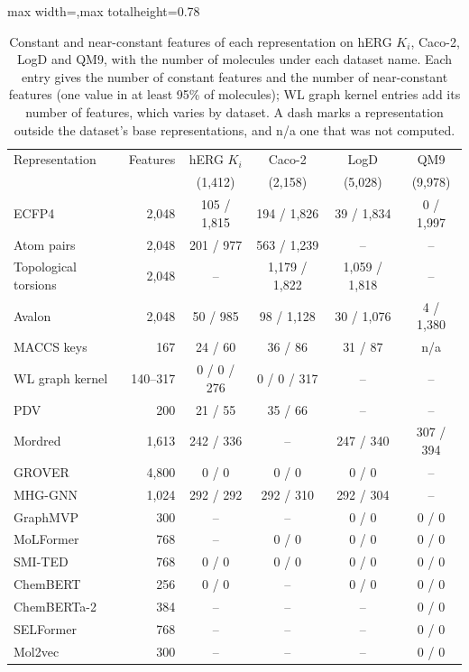 \begin{table}[htbp]
\centering
\small
\setlength{\tabcolsep}{4pt}
\begin{adjustbox}{max width=\textwidth,max totalheight=0.78\textheight}
\begin{tabular}{lrcccc}
\toprule
Representation & Features & hERG $K_i$ & Caco-2 & LogD & QM9 \\
 & & (1,412) & (2,158) & (5,028) & (9,978) \\
\midrule
ECFP4 & 2,048 & 105 / 1,815 & 194 / 1,826 & 39 / 1,834 & 0 / 1,997 \\
Atom pairs & 2,048 & 201 / 977 & 563 / 1,239 & -- & -- \\
Topological torsions & 2,048 & -- & 1,179 / 1,822 & 1,059 / 1,818 & -- \\
Avalon & 2,048 & 50 / 985 & 98 / 1,128 & 30 / 1,076 & 4 / 1,380 \\
MACCS keys & 167 & 24 / 60 & 36 / 86 & 31 / 87 & n/a \\
WL graph kernel & 140--317 & 0 / 0 / 276 & 0 / 0 / 317 & -- & -- \\
PDV & 200 & 21 / 55 & 35 / 66 & -- & -- \\
Mordred & 1,613 & 242 / 336 & -- & 247 / 340 & 307 / 394 \\
GROVER & 4,800 & 0 / 0 & 0 / 0 & 0 / 0 & -- \\
MHG-GNN & 1,024 & 292 / 292 & 292 / 310 & 292 / 304 & -- \\
GraphMVP & 300 & -- & -- & 0 / 0 & 0 / 0 \\
MoLFormer & 768 & -- & 0 / 0 & 0 / 0 & 0 / 0 \\
SMI-TED & 768 & 0 / 0 & 0 / 0 & 0 / 0 & 0 / 0 \\
ChemBERT & 256 & 0 / 0 & -- & 0 / 0 & 0 / 0 \\
ChemBERTa-2 & 384 & -- & -- & -- & 0 / 0 \\
SELFormer & 768 & -- & -- & -- & 0 / 0 \\
Mol2vec & 300 & -- & -- & -- & 0 / 0 \\
\bottomrule
\end{tabular}
\end{adjustbox}
\caption[Constant and near-constant features per representation, part 1.]{Constant and near-constant features of each representation on hERG $K_i$, Caco-2, LogD and QM9, with the number of molecules under each dataset name. Each entry gives the number of constant features and the number of near-constant features (one value in at least 95\% of molecules); WL graph kernel entries add its number of features, which varies by dataset. A dash marks a representation outside the dataset's base representations, and n/a one that was not computed.}
\label{tab:constant_features}
\end{table}

